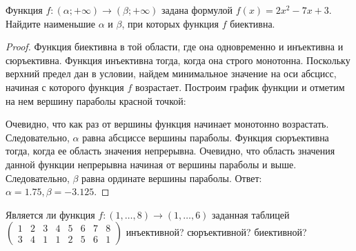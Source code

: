
\renewcommand*{\proofname}{Решение}

\begin{problem}
	Функция $f : (\alpha;+\infty)\rightarrow(\beta;+\infty)$ задана формулой $f(x)=2x^2-7x+3$. Найдите наименьшие $\alpha$ и $\beta$, при которых функция $f$ биективна.
\end{problem}

\begin{proof}
	Функция биективна в той области, где она одновременно и инъективна и сюръективна.
	\newline
	Функция инъективна тогда, когда она строго монотонна. Поскольку верхний предел дан в условии, найдем минимальное значение на оси абсцисс, начиная с которого функция $f$ возрастает.
	\newline
	Построим график функции и отметим на нем вершину параболы красной точкой:
	\begin {center}
	\end {center}
	Очевидно, что как раз от вершины функция начинает монотонно возрастать. Следовательно, $\alpha$ равна абсциссе вершины параболы.
	\newline
	Функция сюръективна тогда, когда ее область значения непрерывна. Очевидно, что область значения данной функции непрерывна начиная от вершины параболы и выше. Следовательно, $\beta$ равна ординате вершины параболы.
	\newline 
	Ответ: $\alpha=1.75, \beta=-3.125$.
\end{proof}

\begin{problem}
	Является ли функция $f : (1,\ldots, 8)\rightarrow(1,\ldots, 6)$ заданная таблицей
	$\begin{pmatrix}
		1 & 2 & 3 & 4 & 5 & 6 & 7 & 8\\
		3 & 4 & 1 & 1 & 2 & 5 & 6 & 1
	\end{pmatrix}$ инъективной? сюръективной? биективной?
\end{problem}

